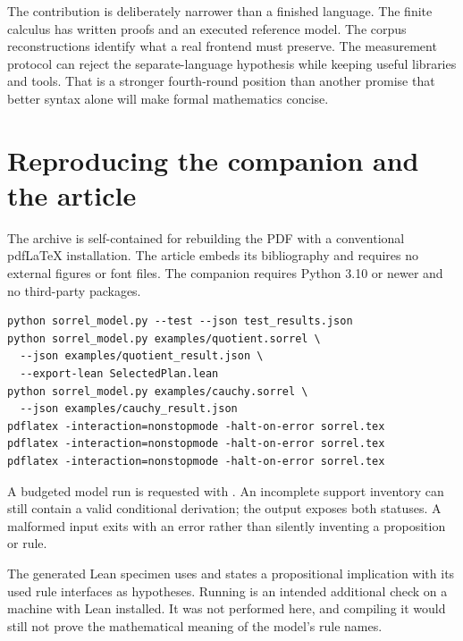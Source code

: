 \documentclass[11pt,a4paper]{article}
\newcommand{\code}[1]{\texttt{\detokenize{#1}}}
\numberwithin{equation}{section}
\theoremstyle{definition}\newtheorem{definition}[theorem]{Definition}
\theoremstyle{remark}\newtheorem{remark}[theorem]{Remark}
\begin{document}
The contribution is deliberately narrower than a finished language. The
finite calculus has written proofs and an executed reference model. The
corpus reconstructions identify what a real frontend must preserve. The
measurement protocol can reject the separate-language hypothesis while keeping
useful libraries and tools. That is a stronger fourth-round position than
another promise that better syntax alone will make formal mathematics concise.

\clearpage\appendix
\section{Reproducing the companion and the article}\label{app:repro}
The archive is self-contained for rebuilding the PDF with a conventional
pdfLaTeX installation. The article embeds its bibliography and requires no
external figures or font files. The companion requires Python 3.10 or newer
and no third-party packages.
\begin{lstlisting}
python sorrel_model.py --test --json test_results.json
python sorrel_model.py examples/quotient.sorrel \
  --json examples/quotient_result.json \
  --export-lean SelectedPlan.lean
python sorrel_model.py examples/cauchy.sorrel \
  --json examples/cauchy_result.json
pdflatex -interaction=nonstopmode -halt-on-error sorrel.tex
pdflatex -interaction=nonstopmode -halt-on-error sorrel.tex
pdflatex -interaction=nonstopmode -halt-on-error sorrel.tex
\end{lstlisting}

A budgeted model run is requested with \code{--budget N}. An incomplete support
inventory can still contain a valid conditional derivation; the output exposes
both statuses. A malformed input exits with an error rather than silently
inventing a proposition or rule.

The generated Lean specimen uses \code{Init} and states a propositional
implication with its used rule interfaces as hypotheses. Running
\code{lean SelectedPlan.lean} is an intended additional check on a machine
with Lean installed. It was not performed here, and compiling it would still
not prove the mathematical meaning of the model's rule names.
\end{document}
